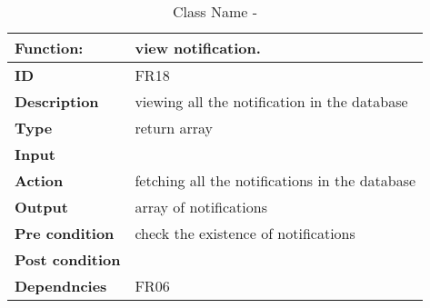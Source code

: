 \documentclass[]{article}
\begin{document}
\FloatBarrier
\begin{table}[h]
\caption{Class Name - }
\label{tab:my-table}
\begin{tabular}{|p{}|p{}|}
\hline
\textbf{Function:} & view notification.
\\ \hline
\textbf{ID}  & FR18           

\\ \hline
\textbf{Description}    & viewing all the notification in the database                                                                    
\\ \hline
\textbf{Type}    & return array       

\\ \hline
\textbf{Input}        & 


\\ \hline
\textbf{Action}            & fetching all the notifications in the database

\\ \hline
\textbf{Output}            & array of notifications

\\ \hline
\textbf{Pre condition}           & check the existence of notifications 

\\ \hline
\textbf{Post condition}           & 


\\ \hline
\textbf{Dependncies}           & FR06
\\ \hline
\end{tabular}
\end{table}
\end{document}
